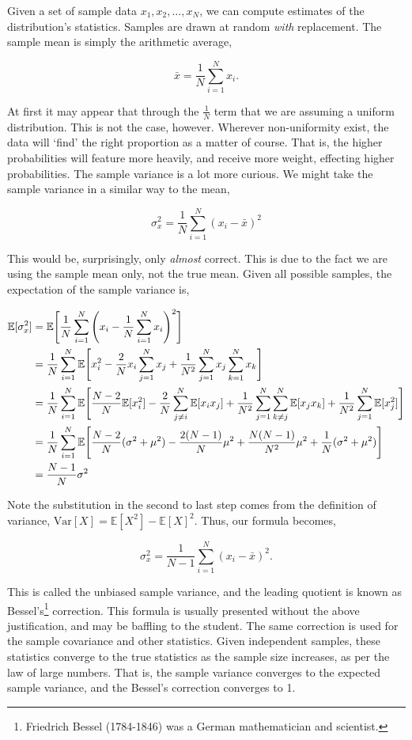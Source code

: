 \documentclass[11pt]{amsart}
\begin{document}
Given a set of sample data $x_1, x_2, \dots, x_N$, we can compute estimates of the distribution's statistics. Samples are drawn at random \emph{with} replacement. The sample mean is simply the arithmetic average,

$$\bar{x} = \frac{1}{N}\sum_{i=1}^N x_i.$$

At first it may appear that through the $\frac{1}{N}$ term that we are assuming a uniform distribution. This is not the case, however. Wherever non-uniformity exist, the data will `find' the right proportion as a matter of course. That is, the higher probabilities will feature more heavily, and receive more weight, effecting higher probabilities. The sample variance is a lot more curious. We might take the sample variance in a similar way to the mean,

$$\sigma_x^2 = \frac{1}{N}\sum_{i=1}^N (x_i - \bar{x})^2$$

This would be, surprisingly, only \emph{almost} correct. This is due to the fact we are using the sample mean only, not the true mean. Given all possible samples, the expectation of the sample variance is,

\begin{align}
\mathbb{E}[\sigma_x^2] &= \mathbb{E}\Bigg[\frac{1}{N}\sum_{i=1}^N\Bigg(x_i - \frac{1}{N}\sum_{i=1}^N x_i\Bigg)^2 \Bigg] \notag \\
&=\frac{1}{N}\sum_{i=1}^N\mathbb{E}\Bigg[x_i^2 - \frac{2}{N}x_i\sum_{j=1}^N x_j + \frac{1}{N^2}\sum_{j=1}^N x_j \sum_{k=1}^N x_k\Bigg] \notag \\
&=\frac{1}{N}\sum_{i=1}^N\mathbb{E}\Bigg[\frac{N-2}{N}\mathbb{E}[x_i^2] - \frac{2}{N}\sum_{j\neq i}^N \mathbb{E}[x_ix_j] + \frac{1}{N^2}\sum_{j=1}^N \sum_{k\neq j}^N \mathbb{E}[x_jx_k] + \frac{1}{N^2}\sum_{j=1}^N \mathbb{E}[x_j^2]\Bigg] \notag \\
&=\frac{1}{N}\sum_{i=1}^N\mathbb{E}\Bigg[\frac{N-2}{N}(\sigma^2 + \mu^2) - \frac{2(N - 1)}{N} \mu^2 + \frac{N(N-1)}{N^2} \mu^2 + \frac{1}{N} (\sigma^2 + \mu^2)\Bigg] \notag \\
&= \frac{N-1}{N}\sigma^2 \notag
\end{align}

Note the substitution in the second to last step comes from the definition of variance, $\text{Var}[X] = \mathbb{E}[X^2] - \mathbb{E}[X]^2$. Thus, our formula becomes,

$$\sigma_x^2 = \frac{1}{N-1}\sum_{i=1}^N (x_i - \bar{x})^2.$$

This is called the unbiased sample variance, and the leading quotient is known as Bessel's\footnote{Friedrich Bessel (1784-1846) was a German mathematician and scientist.} correction. This formula is usually presented without the above justification, and may be baffling to the student. The same correction is used for the sample covariance and other statistics. Given independent samples, these statistics converge to the true statistics as the sample size increases, as per the law of large numbers. That is, the sample variance converges to the expected sample variance, and the Bessel's correction converges to 1.
\end{document}

